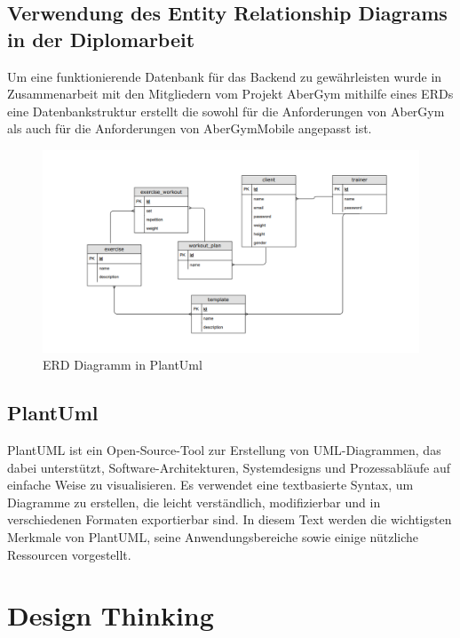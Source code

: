        \pagebreak

    \subsection{Verwendung des Entity Relationship Diagrams in der Diplomarbeit}

    Um eine funktionierende Datenbank für das Backend zu gewährleisten wurde in Zusammenarbeit mit den Mitgliedern vom Projekt AberGym  mithilfe eines ERDs eine Datenbankstruktur erstellt die sowohl für die Anforderungen von AberGym als auch für die Anforderungen von AberGymMobile angepasst ist.

    \begin{figure}[H]
        \centering
        \includegraphics[scale=0.6]{pics/erd plantuml.png}
        \caption{ERD Diagramm in PlantUml}
    \end{figure}

    \subsection{PlantUml}
    PlantUML ist ein Open-Source-Tool zur Erstellung von UML-Diagrammen, das dabei unterstützt, Software-Architekturen, Systemdesigns und Prozessabläufe auf einfache Weise zu visualisieren. Es verwendet eine textbasierte Syntax, um Diagramme zu erstellen, die leicht verständlich, modifizierbar und in verschiedenen Formaten exportierbar sind. In diesem Text werden die wichtigsten Merkmale von PlantUML, seine Anwendungsbereiche sowie einige nützliche Ressourcen vorgestellt.

    \pagebreak
    \section{Design Thinking}


